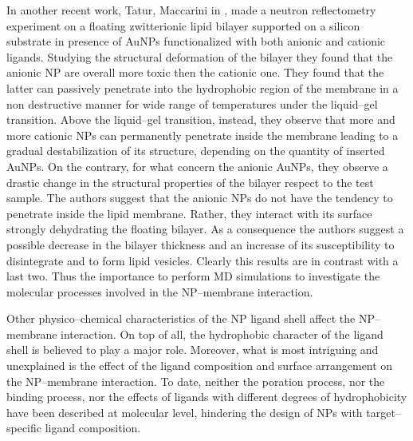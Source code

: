 In another recent work, Tatur, Maccarini \etal in \cite{Maccarini2013}, made a neutron reflectometry experiment on a floating zwitterionic lipid bilayer supported on a silicon substrate in presence of \acp{AuNP} functionalized with both anionic and cationic ligands. Studying the structural deformation of the bilayer they found that the anionic \acs{NP} are overall more toxic then the cationic one. They found that the latter can passively penetrate into the hydrophobic region of the membrane in a non destructive manner for wide range of temperatures under the liquid--gel transition. Above the liquid--gel transition, instead, they observe that more and more cationic \acp{NP} can permanently penetrate inside the membrane leading to a gradual destabilization of its structure, depending on the quantity of inserted \acp{AuNP}. On the contrary, for what concern the anionic \acp{AuNP}, they observe a drastic change in the structural properties of the bilayer respect to the test sample. The authors suggest that the anionic \acp{NP} do not have the tendency to penetrate inside the lipid membrane. Rather, they interact with its surface strongly dehydrating the floating bilayer. As a consequence the authors suggest a possible decrease in the bilayer thickness and an increase of its susceptibility to disintegrate and to form lipid vesicles. Clearly this results are in contrast with a last two. Thus the importance to perform \ac{MD} simulations to investigate the molecular processes involved in the \ac{NP}--membrane interaction.

Other physico--chemical characteristics of the \ac{NP} ligand shell affect the \ac{NP}--membrane interaction. On top of all, the hydrophobic character of the ligand shell is believed to play a major role. Moreover, what is most intriguing and unexplained is the effect of the ligand composition and surface arrangement on the \ac{NP}--membrane interaction. To date, neither the poration process, nor the binding process, nor the effects of ligands with different degrees of hydrophobicity have been described at molecular level, hindering the design of \acp{NP} with target--specific ligand composition.


